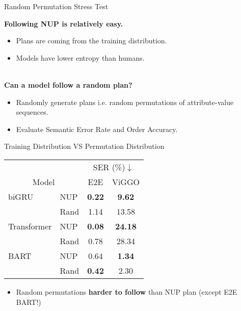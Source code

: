 \begin{frame}{Random Permutation Stress Test}

    {\Large \textbf{Following NUP is relatively easy.}}\\
    \begin{itemize}
        \item Plans are coming from the training distribution.
        \item Models have lower entropy than humans.
    \end{itemize}~\\

    {\Large \textbf{Can a model follow a random plan?}}
        \begin{itemize}
               \item Randomly generate plans i.e. random permutations of attribute-value sequences.
               \item Evaluate Semantic Error Rate and Order Accuracy. 
           \end{itemize}
        

\end{frame}

\begin{frame}{Training Distribution VS Permutation Distribution}
    \begin{center}
    \begin{tabular}{llcc}
        \toprule
        & & \multicolumn{2}{c}{SER (\%)$\downarrow$} \\
            \cmidrule(lr){3-4} 
            \multicolumn{2}{c}{Model} & E2E  & ViGGO \\
            \midrule
            biGRU& NUP & \textbf{0.22} & \textbf{9.62} \\
                 & Rand  & 1.14          & 13.58 \\
            \midrule
            Transformer & NUP & \textbf{0.08} & \textbf{24.18} \\
              &Rand &     0.78   &   28.34 \\
            \midrule
            BART & NUP & 0.64 & \textbf{1.34} \\
                 &Rand &          \textbf{0.42} & 2.30 \\
    \bottomrule
\end{tabular}\end{center}
    \begin{itemize}
\item Random permutations \textbf{harder to follow} than NUP plan (except E2E BART!)\end{itemize}
\end{frame}


